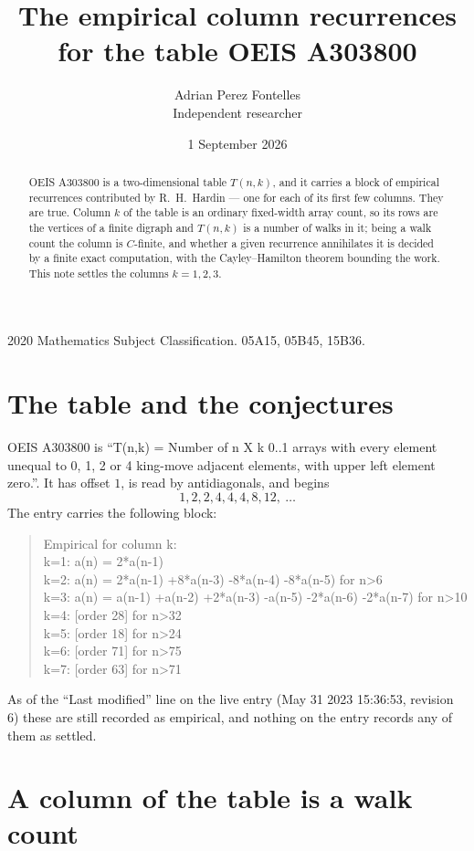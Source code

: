 \documentclass[11pt,a4paper]{article}
\title{The empirical column recurrences for the table OEIS A303800}
\author{Adrian Perez Fontelles\\ \small Independent researcher}
\date{1 September 2026}
\theoremstyle{plain}
\theoremstyle{definition}
\begin{document}
\maketitle

\begin{abstract}
OEIS A303800 is a two-dimensional table $T(n,k)$, and it carries a block of empirical
recurrences contributed by R.~H.~Hardin --- one for each of its first few columns. They are
true. Column $k$ of the table is an ordinary fixed-width array count, so its rows are the
vertices of a finite digraph and $T(n,k)$ is a number of walks in it; being a walk count the
column is $C$-finite, and whether a given recurrence annihilates it is decided by a finite
exact computation, with the Cayley--Hamilton theorem bounding the work. This note settles the columns $k=1, 2, 3$.
\end{abstract}

\noindent\small 2020 Mathematics Subject Classification. 05A15, 05B45, 15B36.\normalsize

\section{The table and the conjectures}

OEIS A303800 is ``T(n,k) = Number of n X k 0..1 arrays with every element unequal to 0, 1, 2 or 4 king-move adjacent elements, with upper left element zero.''. It has offset $1$, is
read by antidiagonals, and begins
\[
1, 2, 2, 4, 4, 4, 8, 12,\ \dots
\]
The entry carries the following block:
\begin{quote}\small
Empirical for column k:\\
k=1: a(n) = 2*a(n-1)\\
k=2: a(n) = 2*a(n-1) +8*a(n-3) -8*a(n-4) -8*a(n-5) for n>6\\
k=3: a(n) = a(n-1) +a(n-2) +2*a(n-3) -a(n-5) -2*a(n-6) -2*a(n-7) for n>10\\
k=4: [order 28] for n>32\\
k=5: [order 18] for n>24\\
k=6: [order 71] for n>75\\
k=7: [order 63] for n>71\\
\end{quote}
As of the ``Last modified'' line on the live entry (May 31 2023 15:36:53, revision 6) these are still
recorded as empirical, and nothing on the entry records any of them as settled.

\section{A column of the table is a walk count}
\end{document}
